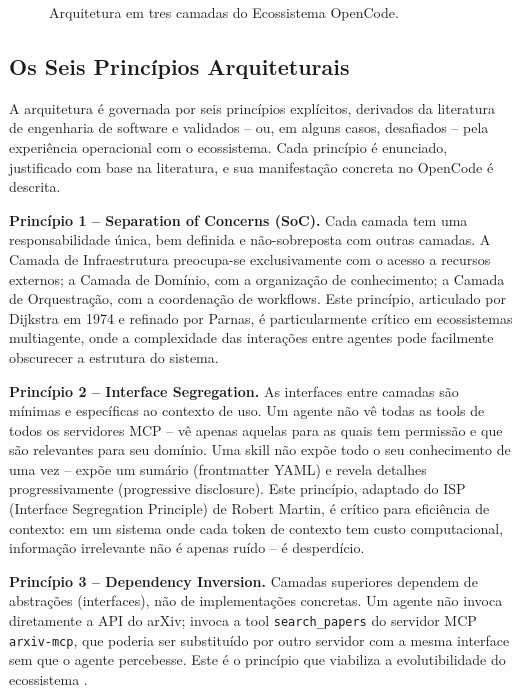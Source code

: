 \documentclass[12pt,a4paper,sumario=tradicional,openany]{abntex2}
\begin{document}
\begin{figure}[H]
{%
}
\caption{Arquitetura em tres camadas do Ecossistema OpenCode.}
\label{fig:arquitetura-3-camadas}
\end{figure}

\subsection{Os Seis Princípios Arquiteturais}

A arquitetura é governada por seis princípios explícitos, derivados da literatura de engenharia de software e validados -- ou, em alguns casos, desafiados -- pela experiência operacional com o ecossistema. Cada princípio é enunciado, justificado com base na literatura, e sua manifestação concreta no OpenCode é descrita.

\textbf{Princípio 1 -- Separation of Concerns (SoC).} Cada camada tem uma
responsabilidade única, bem definida e não-sobreposta com outras camadas.
A Camada de Infraestrutura preocupa-se exclusivamente com o acesso a recursos
externos; a Camada de Domínio, com a organização de conhecimento; a Camada de
Orquestração, com a coordenação de workflows. Este princípio, articulado por
Dijkstra em 1974 e refinado por Parnas, é particularmente crítico em ecossistemas
multiagente, onde a complexidade das interações entre agentes pode facilmente
obscurecer a estrutura do sistema.

\textbf{Princípio 2 -- Interface Segregation.} As interfaces entre camadas são mínimas e específicas ao contexto de uso. Um agente não vê todas as tools de todos os servidores MCP -- vê apenas aquelas para as quais tem permissão e que são relevantes para seu domínio. Uma skill não expõe todo o seu conhecimento de uma vez -- expõe um sumário (frontmatter YAML) e revela detalhes progressivamente (progressive disclosure). Este princípio, adaptado do ISP (Interface Segregation Principle) de Robert Martin, é crítico para eficiência de contexto: em um sistema onde cada token de contexto tem custo computacional, informação irrelevante não é apenas ruído -- é desperdício.

\textbf{Princípio 3 -- Dependency Inversion.} Camadas superiores dependem de abstrações (interfaces), não de implementações concretas. Um agente não invoca diretamente a API do arXiv; invoca a tool \texttt{search\_papers} do servidor MCP \texttt{arxiv-mcp}, que poderia ser substituído por outro servidor com a mesma interface sem que o agente percebesse. Este é o princípio que viabiliza a evolutibilidade do ecossistema \cite{babar2009supporting}.
\end{document}
